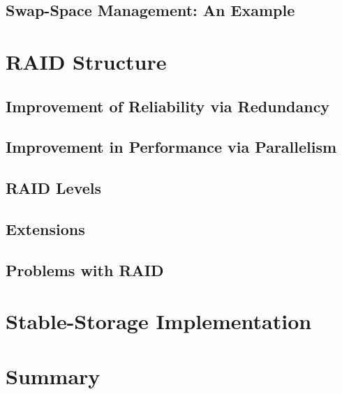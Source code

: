 \documentclass[12pt]{article}
\begin{document}
\subsection{Swap-Space Management: An Example}
\section{RAID Structure}
\subsection{Improvement of Reliability via Redundancy}
\subsection{Improvement in Performance via Parallelism}
\subsection{RAID Levels}
\subsection{Extensions}
\subsection{Problems with RAID}
\section{Stable-Storage Implementation}
\section{Summary}
\end{document}
